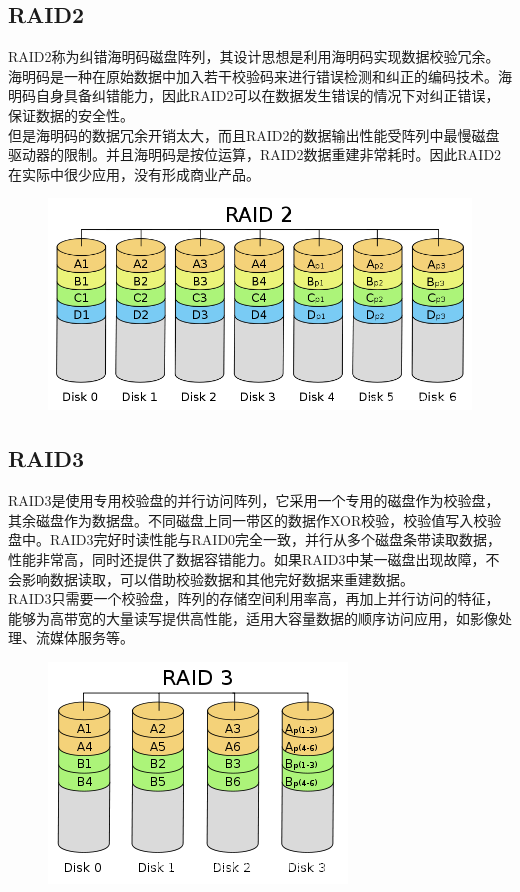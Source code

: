 \subsection{RAID2}

RAID2称为纠错海明码磁盘阵列，其设计思想是利用海明码实现数据校验冗余。海明码是一种在原始数据中加入若干校验码来进行错误检测和纠正的编码技术。海明码自身具备纠错能力，因此RAID2可以在数据发生错误的情况下对纠正错误，保证数据的安全性。 \\

但是海明码的数据冗余开销太大，而且RAID2的数据输出性能受阵列中最慢磁盘驱动器的限制。并且海明码是按位运算，RAID2数据重建非常耗时。因此RAID2在实际中很少应用，没有形成商业产品。

\begin{figure}[H]
	\centering
	\includegraphics[scale=0.5]{img/C4/4-5/3.png}
\end{figure}

\subsection{RAID3}

RAID3是使用专用校验盘的并行访问阵列，它采用一个专用的磁盘作为校验盘，其余磁盘作为数据盘。不同磁盘上同一带区的数据作XOR校验，校验值写入校验盘中。RAID3完好时读性能与RAID0完全一致，并行从多个磁盘条带读取数据，性能非常高，同时还提供了数据容错能力。如果RAID3中某一磁盘出现故障，不会影响数据读取，可以借助校验数据和其他完好数据来重建数据。 \\

RAID3只需要一个校验盘，阵列的存储空间利用率高，再加上并行访问的特征，能够为高带宽的大量读写提供高性能，适用大容量数据的顺序访问应用，如影像处理、流媒体服务等。

\begin{figure}[H]
	\centering
	\includegraphics[]{img/C4/4-5/4.png}
\end{figure}

